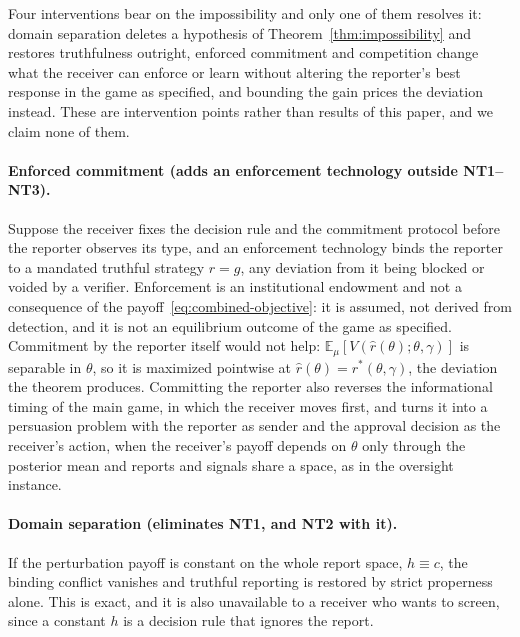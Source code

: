 \documentclass[acmsmall,nonacm,screen]{acmart}
\theoremstyle{acmplain}%
\theoremstyle{acmdefinition}%
\newcommand{\E}{\mathbb{E}}
\numberwithin{equation}{section}
\begin{document}
Four interventions bear on the impossibility and only one of them resolves it: domain separation deletes a hypothesis of Theorem~\ref{thm:impossibility} and restores truthfulness outright, enforced commitment and competition change what the receiver can enforce or learn without altering the reporter's best response in the game as specified, and bounding the gain prices the deviation instead. These are intervention points rather than results of this paper, and we claim none of them.

\paragraph{Enforced commitment (adds an enforcement technology outside NT1--NT3).} Suppose the receiver fixes the decision rule and the commitment protocol before the reporter observes its type, and an enforcement technology binds the reporter to a mandated truthful strategy $\hat{r} = g$, any deviation from it being blocked or voided by a verifier. Enforcement is an institutional endowment and not a consequence of the payoff~\eqref{eq:combined-objective}: it is assumed, not derived from detection, and it is not an equilibrium outcome of the game as specified. Commitment by the reporter itself would not help: $\E_\mu[V(\hat{r}(\theta);\theta,\gamma)]$ is separable in $\theta$, so it is maximized pointwise at $\hat{r}(\theta) = r^*(\theta,\gamma)$, the deviation the theorem produces. Committing the reporter also reverses the informational timing of the main game, in which the receiver moves first, and turns it into a \citet{gentzkow2011bayesian} persuasion problem with the reporter as sender and the approval decision as the receiver's action, when the receiver's payoff depends on $\theta$ only through the posterior mean and reports and signals share a space, as in the oversight instance.

\paragraph{Domain separation (eliminates NT1, and NT2 with it).} If the perturbation payoff is constant on the whole report space, $h \equiv c$, the binding conflict vanishes and truthful reporting is restored by strict properness alone. This is exact, and it is also unavailable to a receiver who wants to screen, since a constant $h$ is a decision rule that ignores the report.
\end{document}
